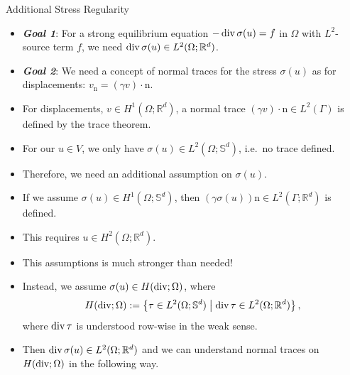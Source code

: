 \documentclass[10pt,aspectratio=169]{beamer}
\def\R{{\mathbb R}}
\def\S{{\mathbb S}}
\newcommand{\diver}{\operatornamewithlimits{div}}
\begin{document}
\begin{frame}{Additional Stress Regularity}
	\begin{itemize}
		\item \textbf{\em Goal 1}: For a strong equilibrium equation $-\diver\sigma(u) = f$ in $\Omega$ with $L^2$-source term $f$, we need $\diver\sigma(u)\in L^2(\Omega;\R^d)$.
		\item \textbf{\em Goal 2}: We need a concept of normal traces for the stress $\sigma(u)$ as for displacements: $v_\mathrm{n} = (\gamma v)\cdot\mathrm{n}$.
		\item For displacements, $v\in H^1(\Omega;\R^d)$, a normal trace $(\gamma v)\cdot\mathrm{n}\in L^2(\Gamma)$ is defined by the trace theorem.
		\item For our $u\in V$, we only have $\sigma(u)\in L^2(\Omega;\S^d)$, i.e.\ no trace defined.
		\item Therefore, we need an additional assumption on $\sigma(u)$.
		\item If we assume $\sigma(u)\in H^1(\Omega;\S^d)$, then $(\gamma\sigma(u))\mathrm{n}\in L^2(\Gamma;\R^d)$ is defined.
		\item This requires $u\in H^2(\Omega;\R^d)$.
		\item This assumptions is much stronger than needed!
		\item Instead, we assume $\sigma(u)\in H(\diver;\Omega)$, where
		      \begin{equation*}
			      H(\diver;\Omega):= \left\{\tau\in L^2(\Omega;\S^d)\;\middle|\;\diver\tau\in L^2(\Omega;\R^d)\right\},
		      \end{equation*}
		      where $\diver \tau$ is understood row-wise in the weak sense.
		\item Then $\diver\sigma(u)\in L^2(\Omega;\R^d)$ and we can understand normal traces on $H(\diver;\Omega)$ in the following way.
	\end{itemize}
\end{frame}
\end{document}
